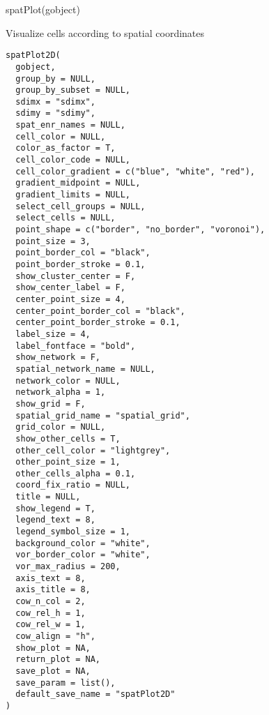\documentclass[a4paper]{book}
\begin{document}
%
\begin{SeeAlso}\relax
{}
\end{SeeAlso}
%
\begin{Examples}
\begin{ExampleCode}
    spatPlot(gobject)
\end{ExampleCode}
\end{Examples}
%
\begin{Description}\relax
Visualize cells according to spatial coordinates
\end{Description}
%
\begin{Usage}
\begin{verbatim}
spatPlot2D(
  gobject,
  group_by = NULL,
  group_by_subset = NULL,
  sdimx = "sdimx",
  sdimy = "sdimy",
  spat_enr_names = NULL,
  cell_color = NULL,
  color_as_factor = T,
  cell_color_code = NULL,
  cell_color_gradient = c("blue", "white", "red"),
  gradient_midpoint = NULL,
  gradient_limits = NULL,
  select_cell_groups = NULL,
  select_cells = NULL,
  point_shape = c("border", "no_border", "voronoi"),
  point_size = 3,
  point_border_col = "black",
  point_border_stroke = 0.1,
  show_cluster_center = F,
  show_center_label = F,
  center_point_size = 4,
  center_point_border_col = "black",
  center_point_border_stroke = 0.1,
  label_size = 4,
  label_fontface = "bold",
  show_network = F,
  spatial_network_name = NULL,
  network_color = NULL,
  network_alpha = 1,
  show_grid = F,
  spatial_grid_name = "spatial_grid",
  grid_color = NULL,
  show_other_cells = T,
  other_cell_color = "lightgrey",
  other_point_size = 1,
  other_cells_alpha = 0.1,
  coord_fix_ratio = NULL,
  title = NULL,
  show_legend = T,
  legend_text = 8,
  legend_symbol_size = 1,
  background_color = "white",
  vor_border_color = "white",
  vor_max_radius = 200,
  axis_text = 8,
  axis_title = 8,
  cow_n_col = 2,
  cow_rel_h = 1,
  cow_rel_w = 1,
  cow_align = "h",
  show_plot = NA,
  return_plot = NA,
  save_plot = NA,
  save_param = list(),
  default_save_name = "spatPlot2D"
)
\end{verbatim}
\end{Usage}
%
\end{document}
